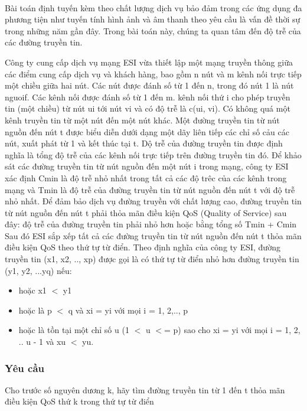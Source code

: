 

 

Bài toán định tuyến kèm theo chất lượng dịch vụ bảo đảm trong các ứng dụng đa phương tiện như tuyến tính hình ảnh và âm thanh theo yêu cầu là vấn đề thời sự trong những năm gần đây. Trong bài toán này, chúng ta quan tâm đến độ trễ của các đường truyền tin.

Công ty cung cấp dịch vụ mạng ESI vừa thiết lập một mạng truyền thông giữa các điểm cung cấp dịch vụ và khách hàng, bao gồm n nút và m kênh nối trực tiếp một chiều giữa hai nút. Các nút được đánh số từ 1 đến n, trong đó nút 1 là nút nguoif. Các kênh nối được đánh số từ 1 đến m. kênh nối thứ i cho phép truyền tin (một chiều) từ nút ui tới nút vi và có độ trễ là c(ui, vi). Có không quá một kênh truyền tin từ một nút đến một nút khác. Một đường truyền tin từ nút nguồn đến nút t được biểu diễn dưới dạng một dãy liên tiếp các chỉ số cảu các nút, xuất phát từ 1 và kết thúc tại t. Dộ trễ của đường truyền tin được định nghĩa là tổng độ trễ của các kênh nối trực tiếp trên đường truyền tin đó. Để khảo sát các đường truyền tin từ nút nguồn đến một nút i trong mạng, công ty ESI xác định Cmin là độ trễ nhỏ nhất trong tất cả các độ trêc của các kênh trong mạng và Tmin là độ trễ của đường truyền tin từ nút nguồn đến nút t với độ trễ nhỏ nhất. Để đảm bảo dịch vụ đường truyền với chất lượng cao, đường truyền tin từ nút nguồn đến nút t phải thỏa mãn điều kiện QoS (Quality of Service) sau đây: độ trễ của đường truyền tin phải nhỏ hơn hoặc bằng tổng số Tmin + Cmin Sau đó ESI sắp xếp tất cả các đường truyền tin từ nút nguồn đến nút t thỏa mãn điều kiện QoS theo thứ tự từ điển. Theo định nghĩa của công ty ESI, đường truyền tin (x1, x2, .., xp) được gọi là có thứ tự từ điển nhỏ hơn đường truyền tin (y1, y2, ...yq) nếu:
\begin{itemize}
	\item hoặc x1 $<$ y1
	\item hoặc là p $<$ q và xi = yi với mọi i = 1, 2,.., p
	\item hoặc là tồn tại một chỉ số u (1 $<$ u $<$= p) sao cho xi = yi với mọi i = 1, 2, .. u - 1 và xu $<$ yu.
\end{itemize}

\subsubsection{Yêu cầu}

Cho trước số nguyên dương k, hãy tìm đường truyền tin từ 1 đến t thỏa mãn điều kiện QoS thứ k trong thứ tự từ điển

